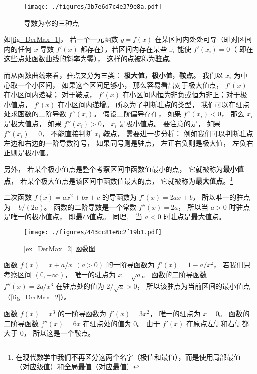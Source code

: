 
\begin{figure}[ht]
\vskip-10pt
\centering
\texttt{[image: ./figures/3b7e6d7c4e379e8a.pdf]}
\caption{导数为零的三种点}\label{fig_DerMax_1}
\end{figure}

如\autoref{fig_DerMax_1}， 若一个一元函数 $y = f(x)$ 在某区间内处处可导（即对区间内的任何 $x$ 导数 $f'(x)$ 都存在），若区间内存在某些 $x_i$ 能使 $f'(x_i) = 0$（ 即在这些点处函数曲线的斜率为零）， 这样的点被称为\textbf{驻点}。

而从函数曲线来看，驻点又分为三类： \textbf{极大值}，\textbf{极小值}，\textbf{鞍点}。 我们以 $x_i$ 为中心取一个小区间， 如果这个区间足够小， 那么容易看出对于极大值点， $f'(x)$ 在小区间内递减； 对于鞍点， $f'(x)$ 在小区间内恒为非负或恒为非正；对于极小值点， $f'(x)$ 在小区间内递增。 所以为了判断驻点的类型， 我们可以在驻点处求函数的二阶导数 $f''(x_i)$。 假设二阶偏导存在， 如果 $f''(x_i) < 0$， 那么 $x_i$ 是极大值点， 如果 $f''(x_i) > 0$， $x_i$ 是极小值点。 要注意的是， 如果 $f''(x_i) = 0$， 不能直接判断 $x_i$  鞍点， 需要进一步分析： 例如我们可以判断驻点左边和右边的一阶导数符号， 如果同号则是驻点， 左正右负则是极大值， 左负右正则是极小值。

另外， 若某个极小值点是整个考察区间中函数值最小的点， 它就被称为\textbf{最小值点}， 若某个极大值点是该区间中函数值最大的点， 它就被称为\textbf{最大值点}。\footnote{在现代数学中我们不再区分这两个名字（极值和最值），而是使用局部最值（对应级值）和全局最值（对应最值）}

\begin{example}{}
二次函数 $f(x) = ax^2 + bx + c$ 的导函数为 $f'(x) = 2ax + b$， 所以唯一的驻点为 $-b/(2a)$。 函数的二阶导数是一个常数 $f''(x) = 2a$， 所以当 $a > 0$ 时驻点是唯一的极小值点， 即最小值点。 同理， 当 $a < 0$ 时驻点是最大值点。
\end{example}

\begin{figure}[ht]
\centering
\texttt{[image: ./figures/443cc81e6c2f19b1.pdf]}
\caption{\autoref{ex_DerMax_2} 函数图} \label{fig_DerMax_2}
\end{figure}

\begin{example}{}\label{ex_DerMax_2}
函数 $f(x) = x+a/x \ \ (a > 0)$ 的一阶导函数为 $f'(x) = 1 - a/x^2$， 若我们只考察区间 $(0, +\infty)$， 唯一的驻点为 $x = \sqrt{a}$。 函数的二阶导函数 $f''(x) = 2a/x^3$ 在驻点处的值为 $2/\sqrt{a} > 0$， 所以该驻点为当前区间的最小值点（\autoref{fig_DerMax_2}）。
\end{example}

\begin{example}{}\label{ex_DerMax_3}
函数 $f(x) = x^3$ 的一阶导函数为 $f'(x) = 3x^2$， 唯一的驻点为 $x = 0$。 函数的二阶导函数 $f''(x) = 6x$ 在驻点处的值为 $0$。 由于 $f'(x)$ 在原点左侧和右侧都大于 0， 所以这是一个鞍点。
\end{example}
